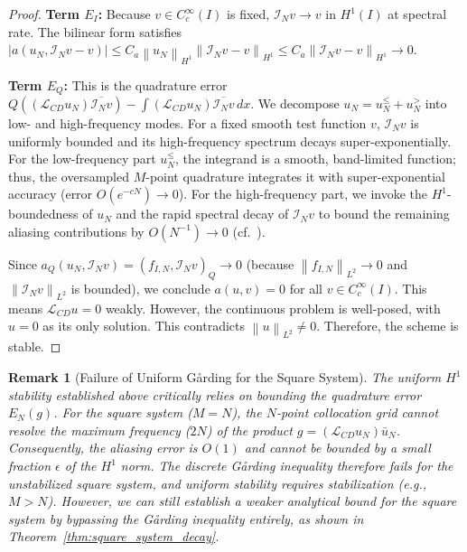 \documentclass[pdflatex,sn-mathphys-num]{sn-jnl}%
\theoremstyle{thmstyleone}%
\newtheorem{remark}{Remark}
\newcommand{\norm}[1]{\left\lVert#1\right\rVert}
\begin{document}
\begin{proof}
\textbf{Term $E_I$:} Because $v \in C_c^\infty(I)$ is fixed, $\mathcal{I}_N v \to v$ in $H^1(I)$ at spectral rate. The bilinear form satisfies $|a(u_N, \mathcal{I}_N v - v)| \le C_a \norm{u_N}_{H^1} \norm{\mathcal{I}_N v - v}_{H^1} \le C_a \norm{\mathcal{I}_N v - v}_{H^1} \to 0$.

\textbf{Term $E_Q$:} This is the quadrature error $Q((\mathcal{L}_{CD}u_N)\overline{\mathcal{I}_N v}) - \int (\mathcal{L}_{CD}u_N)\overline{\mathcal{I}_N v}\,dx$. We decompose $u_N = u_N^{\le} + u_N^{>}$ into low- and high-frequency modes. For a fixed smooth test function $v$, $\mathcal{I}_N v$ is uniformly bounded and its high-frequency spectrum decays super-exponentially. For the low-frequency part $u_N^{\le}$, the integrand is a smooth, band-limited function; thus, the oversampled $M$-point quadrature integrates it with super-exponential accuracy (error $O(e^{-cN}) \to 0$). For the high-frequency part, we invoke the $H^1$-boundedness of $u_N$ and the rapid spectral decay of $\mathcal{I}_N v$ to bound the remaining aliasing contributions by $O(N^{-1}) \to 0$ (cf.\ \cite[Sec.~6.4]{canuto2006spectral}).

Since $a_Q(u_N, \mathcal{I}_N v) = (f_{I,N}, \mathcal{I}_N v)_Q \to 0$ (because $\norm{f_{I,N}}_{L^2} \to 0$ and $\norm{\mathcal{I}_N v}_{L^2}$ is bounded), we conclude $a(u,v) = 0$ for all $v \in C_c^\infty(I)$. This means $\mathcal{L}_{CD}u=0$ weakly. However, the continuous problem is well-posed, with $u=0$ as its only solution. This contradicts $\norm{u}_{L^2} \ne 0$. Therefore, the scheme is stable.
\end{proof}

\begin{remark}[Failure of Uniform G\r{a}rding for the Square System]
\label{rem:H1_square}
The uniform $H^1$ stability established above critically relies on bounding the quadrature error $E_N(g)$. For the square system ($M=N$), the $N$-point collocation grid cannot resolve the maximum frequency ($2N$) of the product $g = (\mathcal{L}_{CD}u_N)\bar{u}_N$. Consequently, the aliasing error is $O(1)$ and cannot be bounded by a small fraction $\epsilon$ of the $H^1$ norm. The discrete G\r{a}rding inequality therefore fails for the unstabilized square system, and uniform stability requires stabilization (e.g., $M > N$). However, we can still establish a weaker analytical bound for the square system by bypassing the G\r{a}rding inequality entirely, as shown in Theorem~\ref{thm:square_system_decay}.
\end{remark}
\end{document}
